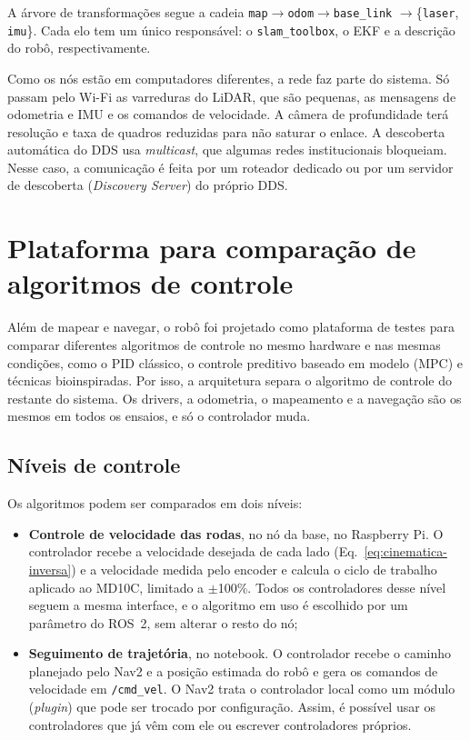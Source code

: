 A árvore de transformações segue a cadeia
\texttt{map}$\rightarrow$\texttt{odom}$\rightarrow$\texttt{base\_link}%
$\rightarrow$\{\texttt{laser}, \texttt{imu}\}. Cada elo tem um único
responsável: o \texttt{slam\_toolbox}, o EKF e a descrição do robô,
respectivamente.

Como os nós estão em computadores diferentes, a rede faz parte do
sistema. Só passam pelo Wi-Fi as varreduras do LiDAR, que são pequenas,
as mensagens de odometria e IMU e os comandos de velocidade. A câmera de
profundidade terá resolução e taxa de quadros reduzidas para não saturar
o enlace. A descoberta automática do DDS usa \textit{multicast}, que
algumas redes institucionais bloqueiam. Nesse caso, a comunicação é feita
por um roteador dedicado ou por um servidor de descoberta (\textit{Discovery
Server}) do próprio DDS.

\section{Plataforma para comparação de algoritmos de controle}
\label{sec:algoritmos}

Além de mapear e navegar, o robô foi projetado como plataforma de testes
para comparar diferentes algoritmos de controle no mesmo hardware e nas
mesmas condições, como o PID clássico, o controle preditivo baseado em
modelo (MPC) e técnicas bioinspiradas. Por isso, a arquitetura separa o
algoritmo de controle do restante do sistema. Os drivers, a odometria, o
mapeamento e a navegação são os mesmos em todos os ensaios, e só o
controlador muda.

\subsection{Níveis de controle}

Os algoritmos podem ser comparados em dois níveis:

\begin{itemize}
	\item \textbf{Controle de velocidade das rodas}, no nó da base, no
	Raspberry Pi. O controlador recebe a velocidade desejada de cada lado
	(Eq.~\ref{eq:cinematica-inversa}) e a velocidade medida pelo encoder e
	calcula o ciclo de trabalho aplicado ao MD10C, limitado a $\pm$100\%.
	Todos os controladores desse nível seguem a mesma interface, e o
	algoritmo em uso é escolhido por um parâmetro do ROS~2, sem alterar o
	resto do nó;
	\item \textbf{Seguimento de trajetória}, no notebook. O controlador
	recebe o caminho planejado pelo Nav2 e a posição estimada do robô e
	gera os comandos de velocidade em \texttt{/cmd\_vel}. O Nav2 trata o
	controlador local como um módulo (\textit{plugin}) que pode ser
	trocado por configuração. Assim, é possível usar os controladores que
	já vêm com ele ou escrever controladores próprios.
\end{itemize}

